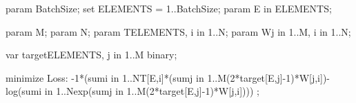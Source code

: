 param BatchSize;
set ELEMENTS = 1..BatchSize;
param E in ELEMENTS;

param M;
param N;
param T{ELEMENTS, i in 1..N};
param W{j in 1..M, i in 1..N};

var target{ELEMENTS, j in 1..M} binary;

minimize Loss:
	-1*(sum{i in 1..N}T[E,i]*(sum{j in 1..M}(2*target[E,j]-1)*W[j,i])-log(sum{i in 1..N}exp(sum{j in 1..M}(2*target[E,j]-1)*W[j,i]))) ;
	



	
